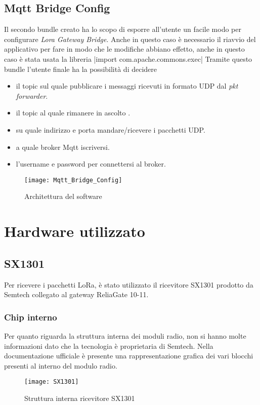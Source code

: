 \subsection{Mqtt Bridge Config}
Il secondo bundle creato ha lo scopo di esporre all'utente un facile modo per
configurare  \emph{Lora Gateway Bridge}.  Anche in questo caso è necessario il
riavvio del applicativo per fare in modo che le modifiche abbiano effetto, anche
in questo caso è stata usata la libreria
|import com.apache.commons.exec|
Tramite questo bundle l'utente finale ha la possibilità di decidere 
\begin{itemize}
\item il topic sul quale pubblicare i messaggi ricevuti in formato UDP dal
\emph{pkt forwarder}.
\item il topic al quale rimanere in ascolto .
\item su quale indirizzo e porta mandare/ricevere i pacchetti UDP.
\item a quale broker Mqtt iscriversi.
\item l'username e password per connettersi al broker.
\end{itemize}

\begin{figure}[h]
\centering 
\texttt{[image: Mqtt\_Bridge\_Config]}
\caption{Architettura del software}
\label{fig:Software_stack}
\end{figure}
\section{Hardware utilizzato}



\subsection{SX1301}
Per ricevere i pacchetti LoRa, è stato utilizzato il ricevitore SX1301 prodotto
da Semtech collegato al gateway ReliaGate 10-11.
\subsubsection{Chip interno}
Per quanto riguarda la struttura interna dei moduli radio, non si hanno molte
informazioni dato che la tecnologia è proprietaria di Semtech. Nella
documentazione ufficiale è presente una rappresentazione grafica dei vari
blocchi presenti al interno del modulo radio.

\begin{figure}[h]
\centering 
\texttt{[image: SX1301]}
\caption{Struttura interna ricevitore SX1301}
\label{fig:sx1301}
\end{figure}

